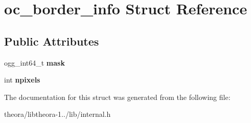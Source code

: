 \hypertarget{structoc__border__info}{\section{oc\+\_\+border\+\_\+info Struct Reference}
\label{structoc__border__info}
}
\subsection*{Public Attributes}
\begin{DoxyCompactItemize}
\item 
\hypertarget{structoc__border__info_a9f65ce25040f6ff0502062d7273057b2}{ogg\+\_\+int64\+\_\+t {\bfseries mask}}\label{structoc__border__info_a9f65ce25040f6ff0502062d7273057b2}

\item 
\hypertarget{structoc__border__info_a190338473d537a5685c92ca040425eae}{int {\bfseries npixels}}\label{structoc__border__info_a190338473d537a5685c92ca040425eae}

\end{DoxyCompactItemize}


The documentation for this struct was generated from the following file\+:\begin{DoxyCompactItemize}
\item 
theora/libtheora-\/1../lib/internal.\+h\end{DoxyCompactItemize}
